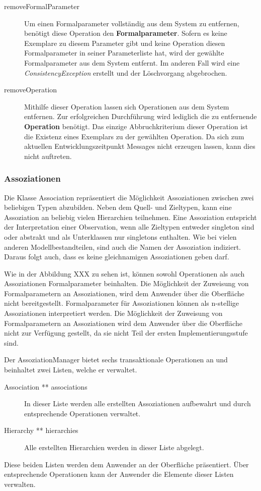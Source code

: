 \begin{description}
\item[removeFormalParameter]
Um einen Formalparameter vollständig aus dem System zu entfernen, benötigt diese Operation den \textbf{Formalparameter}. Sofern es keine Exemplare zu diesem Parameter gibt und keine Operation diesen Formalparameter in seiner Parameterliste hat, wird der gewählte Formalparameter aus dem System entfernt. Im anderen Fall wird eine \emph{ConsistencyException} erstellt und der Löschvorgang abgebrochen.
\item[removeOperation]
Mithilfe dieser Operation lassen sich Operationen aus dem System entfernen. Zur erfolgreichen Durchführung wird lediglich die zu entfernende \textbf{Operation} benötigt. Das einzige Abbruchkriterium dieser Operation ist die Existenz eines Exemplars zu der gewählten Operation. Da sich zum aktuellen Entwicklungszeitpunkt Messages nicht erzeugen lassen, kann dies nicht auftreten.

\end{description}

\subsubsection{Assoziationen}\label{Operation:Associationen}

Die Klasse Association repräsentiert die Möglichkeit Assoziationen zwischen zwei beliebigen Typen abzubilden.
Neben dem Quell- und Zieltypen, kann eine Assoziation an beliebig vielen Hierarchien teilnehmen.
Eine Assoziation entspricht der Interpretation einer Observation, wenn alle Zieltypen entweder singleton sind oder abstrakt und als Unterklassen nur singletons enthalten.
Wie bei vielen anderen Modellbestandteilen, sind auch die Namen der Assoziation indiziert. Daraus folgt auch, dass es keine gleichnamigen 
Assoziationen geben darf.

Wie in der Abbildung XXX zu sehen ist, können sowohl Operationen als auch Assoziationen Formalparameter beinhalten. Die Möglichkeit der Zuweisung von
Formalparametern an Assoziationen, wird dem Anwender über die Oberfläche nicht bereitgestellt. 
Formalparameter für Assoziationen können als n-stellige Assoziationen interpretiert werden.
Die Möglichkeit der Zuweisung von Formalparametern an Assoziationen wird dem Anwender über die Oberfläche nicht zur Verfügung gestellt, da sie nicht Teil der ersten Implementierungsstufe sind.


Der AssoziationManager bietet sechs transaktionale Operationen an und beinhaltet zwei Listen, welche er verwaltet.
\begin{description}
\item[Association ** associations] In dieser Liste werden alle erstellten Assoziationen aufbewahrt und durch entsprechende Operationen verwaltet.
\item[Hierarchy ** hierarchies] Alle erstellten Hierarchien werden in dieser Liste abgelegt.
\end{description}
Diese beiden Listen werden dem Anwender an der 
Oberfläche präsentiert. Über entsprechende Operationen kann der Anwender die Elemente dieser Listen verwalten.

